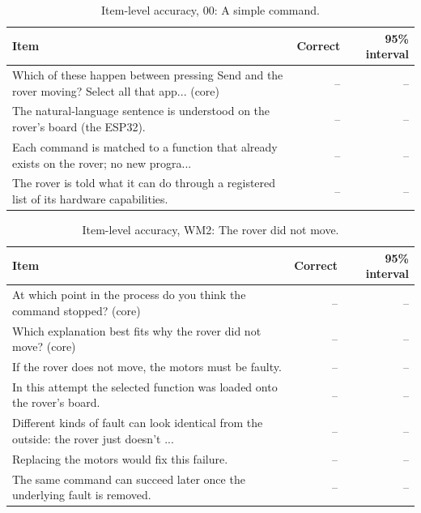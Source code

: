 \begin{table}[t]
\caption{Item-level accuracy, 00: A simple command.}\label{tab:items-normal}
\small
\begin{tabular}{p{7.2cm}rr}
\toprule
Item & Correct & 95\% interval\\
\midrule
Which of these happen between pressing Send and the rover moving? Select all that app... (core) & -- & --\\
The natural-language sentence is understood on the rover's board (the ESP32). & -- & --\\
Each command is matched to a function that already exists on the rover; no new progra... & -- & --\\
The rover is told what it can do through a registered list of its hardware capabilities. & -- & --\\
\bottomrule
\end{tabular}
\end{table}

\begin{table}[t]
\caption{Item-level accuracy, WM2: The rover did not move.}\label{tab:items-wm2}
\small
\begin{tabular}{p{7.2cm}rr}
\toprule
Item & Correct & 95\% interval\\
\midrule
At which point in the process do you think the command stopped? (core) & -- & --\\
Which explanation best fits why the rover did not move? (core) & -- & --\\
If the rover does not move, the motors must be faulty. & -- & --\\
In this attempt the selected function was loaded onto the rover's board. & -- & --\\
Different kinds of fault can look identical from the outside: the rover just doesn't ... & -- & --\\
Replacing the motors would fix this failure. & -- & --\\
The same command can succeed later once the underlying fault is removed. & -- & --\\
\bottomrule
\end{tabular}
\end{table}

